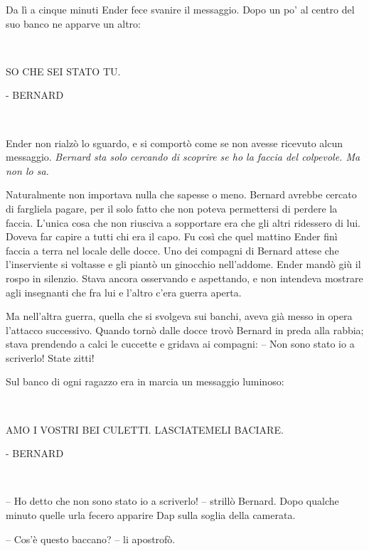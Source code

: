 {Da lì a cinque minuti Ender fece svanire il messaggio. Dopo un po' al
	centro del suo banco ne apparve un altro:}

{~}

\begin{center}
	{SO CHE SEI STATO TU.}
\end{center}

\begin{flushright}
	{- BERNARD}
\end{flushright}

{~}

{Ender non rialzò lo sguardo, e si comportò come se non avesse ricevuto
	alcun messaggio. \emph{Bernard sta solo cercando di scoprire se ho la
		faccia del colpevole. Ma non lo sa.}}

{Naturalmente non importava nulla che sapesse o meno. Bernard avrebbe
	cercato di fargliela pagare, per il solo fatto che non poteva
	permettersi di perdere la faccia. L'unica cosa che non riusciva a
	sopportare era che gli altri ridessero di lui. Doveva far capire a tutti
	chi era il capo. Fu così che quel mattino Ender finì faccia a terra nel
	locale delle docce. Uno dei compagni di Bernard attese che l'inserviente
	si voltasse e gli piantò un ginocchio nell'addome. Ender mandò giù il
	rospo in silenzio. Stava ancora osservando e aspettando, e non intendeva
	mostrare agli insegnanti che fra lui e l'altro c'era guerra aperta.}

{Ma nell'altra guerra, quella che si svolgeva sui banchi, aveva già
	messo in opera l'attacco successivo. Quando tornò dalle docce trovò
	Bernard in preda alla rabbia; stava prendendo a calci le cuccette e
	gridava ai compagni: -- Non sono stato io a scriverlo! State zitti!}

{Sul banco di ogni ragazzo era in marcia un messaggio luminoso:}

{~}

\begin{center}
	{AMO I VOSTRI BEI CULETTI. LASCIATEMELI BACIARE.}
\end{center}

\begin{flushright}
	{- BERNARD}
\end{flushright}

{~}

{-- Ho detto che non sono stato io a scriverlo! -- strillò Bernard. Dopo
	qualche minuto quelle urla fecero apparire Dap sulla soglia della
	camerata.}

{-- Cos'è questo baccano? -- li apostrofò.}

